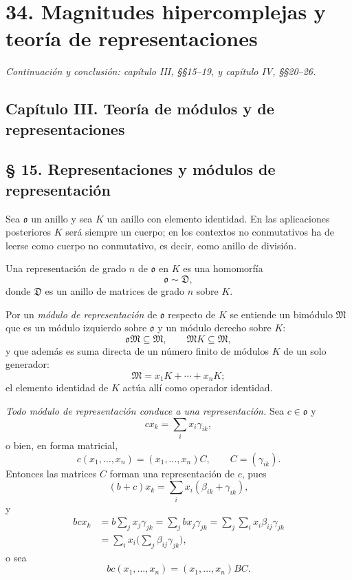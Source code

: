 \documentclass[11pt]{article}
\providecommand{\mM}{\mathfrak{M}}
\providecommand{\mo}{\mathfrak{o}}
\begin{document}
\setcounter{footnote}{0}
\section*{34. Magnitudes hipercomplejas y teoría de representaciones}
\emph{Continuación y conclusión: capítulo III, §§15--19, y capítulo IV, §§20--26.}

\subsection*{Capítulo III. Teoría de módulos y de representaciones}

\subsection*{§ 15. Representaciones y módulos de representación}

Sea $\mo$ un anillo y sea $K$ un anillo con elemento identidad. En las aplicaciones posteriores $K$ será siempre un cuerpo; en los contextos no conmutativos ha de leerse como cuerpo no conmutativo, es decir, como anillo de división.

Una representación de grado $n$ de $\mo$ en $K$ es una homomorfía
\[
        \mo \sim \mathfrak D,
\]
donde $\mathfrak D$ es un anillo de matrices de grado $n$ sobre $K$.

Por un \emph{módulo de representación} de $\mo$ respecto de $K$ se entiende un bimódulo $\mM$ que es un módulo izquierdo sobre $\mo$ y un módulo derecho sobre $K$:
\[
        \mo\mM\subseteq \mM,
        \qquad
        \mM K\subseteq \mM,
\]
y que además es suma directa de un número finito de módulos $K$ de un solo generador:
\[
        \mM=x_1K+\cdots+x_nK;
\]
el elemento identidad de $K$ actúa allí como operador identidad.

\emph{Todo módulo de representación conduce a una representación.} Sea $c\in\mo$ y
\[
        cx_k=\sum_i x_i\gamma_{ik},
\]
o bien, en forma matricial,
\[
        c(x_1,\ldots,x_n)=(x_1,\ldots,x_n)C,
        \qquad C=(\gamma_{ik}).
\]
Entonces las matrices $C$ forman una representación de $c$, pues
\[
        (b+c)x_k=\sum_i x_i(\beta_{ik}+\gamma_{ik}),
\]
y
\[
\begin{aligned}
        bcx_k
        &=b\sum_jx_j\gamma_{jk}
          =\sum_j b x_j\gamma_{jk}
          =\sum_j\sum_i x_i\beta_{ij}\gamma_{jk}       \\
        &=\sum_i x_i\biggl(\sum_j\beta_{ij}\gamma_{jk}\biggr),
\end{aligned}
\]
o sea
\[
        bc(x_1,\ldots,x_n)=(x_1,\ldots,x_n)BC.
\]
\end{document}
